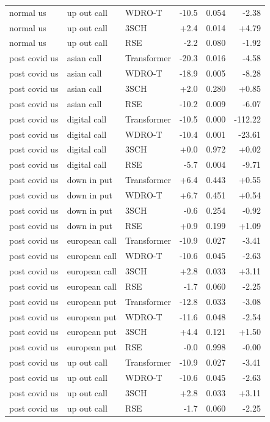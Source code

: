 \begin{table}[h]
\begin{tabular}{lllrrr}
normal us & up out call & WDRO-T & -10.5 & 0.054 & -2.38 \\
normal us & up out call & 3SCH & +2.4 & 0.014 & +4.79 \\
normal us & up out call & RSE & -2.2 & 0.080 & -1.92 \\
post covid us & asian call & Transformer & -20.3 & 0.016 & -4.58 \\
post covid us & asian call & WDRO-T & -18.9 & 0.005 & -8.28 \\
post covid us & asian call & 3SCH & +2.0 & 0.280 & +0.85 \\
post covid us & asian call & RSE & -10.2 & 0.009 & -6.07 \\
post covid us & digital call & Transformer & -10.5 & 0.000 & -112.22 \\
post covid us & digital call & WDRO-T & -10.4 & 0.001 & -23.61 \\
post covid us & digital call & 3SCH & +0.0 & 0.972 & +0.02 \\
post covid us & digital call & RSE & -5.7 & 0.004 & -9.71 \\
post covid us & down in put & Transformer & +6.4 & 0.443 & +0.55 \\
post covid us & down in put & WDRO-T & +6.7 & 0.451 & +0.54 \\
post covid us & down in put & 3SCH & -0.6 & 0.254 & -0.92 \\
post covid us & down in put & RSE & +0.9 & 0.199 & +1.09 \\
post covid us & european call & Transformer & -10.9 & 0.027 & -3.41 \\
post covid us & european call & WDRO-T & -10.6 & 0.045 & -2.63 \\
post covid us & european call & 3SCH & +2.8 & 0.033 & +3.11 \\
post covid us & european call & RSE & -1.7 & 0.060 & -2.25 \\
post covid us & european put & Transformer & -12.8 & 0.033 & -3.08 \\
post covid us & european put & WDRO-T & -11.6 & 0.048 & -2.54 \\
post covid us & european put & 3SCH & +4.4 & 0.121 & +1.50 \\
post covid us & european put & RSE & -0.0 & 0.998 & -0.00 \\
post covid us & up out call & Transformer & -10.9 & 0.027 & -3.41 \\
post covid us & up out call & WDRO-T & -10.6 & 0.045 & -2.63 \\
post covid us & up out call & 3SCH & +2.8 & 0.033 & +3.11 \\
post covid us & up out call & RSE & -1.7 & 0.060 & -2.25 \\
\bottomrule\end{tabular}\end{table}
